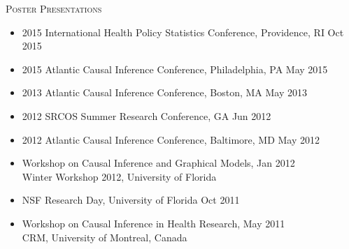 \documentclass[10pt]{article}
\newenvironment{innerlist}[1][\enskip\textbullet]%
        {\begin{itemize}[#1,leftmargin=*,parsep=0pt,itemsep=0pt,topsep=0pt,partopsep=0pt]}
        {\end{itemize}}
\begin{document}
\bigskip

\textsc{Poster Presentations}
\smallskip
\begin{innerlist}
\item[] 2015 International Health Policy Statistics Conference, Providence, RI
  \hfill Oct 2015\\
\item[] 2015 Atlantic Causal Inference Conference, Philadelphia, PA
  \hfill May 2015\\
\item[] 2013 Atlantic Causal Inference Conference, Boston, MA
  \hfill May 2013\\
\item[] 2012 SRCOS Summer Research Conference, GA
  \hfill Jun 2012\\
\item[] 2012 Atlantic Causal Inference Conference, Baltimore, MD
  \hfill May 2012\\
\item[] Workshop on Causal Inference and Graphical Models,
  \hfill Jan 2012\\
 Winter Workshop 2012, University of Florida\\
\item[] NSF Research Day, University of Florida
  \hfill Oct 2011\\
\item[] Workshop on Causal Inference in Health Research, 
  \hfill May 2011\\
CRM, University of Montreal, Canada\\
\end{innerlist}
\end{document}
